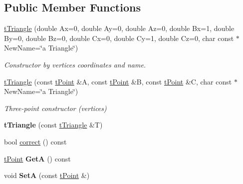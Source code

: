 \subsection*{Public Member Functions}
\begin{DoxyCompactItemize}
\item 
\mbox{\label{classtTriangle_a7d9deae65de86bc7dd8c4659921ab7e4}} 
\hyperlink{classtTriangle_a7d9deae65de86bc7dd8c4659921ab7e4}{t\+Triangle} (double Ax=0, double Ay=0, double Az=0, double Bx=1, double By=0, double Bz=0, double Cx=0, double Cy=1, double Cz=0, char const $\ast$New\+Name=\char`\"{}a Triangle\char`\"{})
\begin{DoxyCompactList}\small\item\em Constructor by vertices coordinates and name. \end{DoxyCompactList}\item 
\mbox{\label{classtTriangle_a083202f8a4ee5ad43997f7dfd02aa903}} 
\hyperlink{classtTriangle_a083202f8a4ee5ad43997f7dfd02aa903}{t\+Triangle} (const \hyperlink{classtPoint}{t\+Point} \&A, const \hyperlink{classtPoint}{t\+Point} \&B, const \hyperlink{classtPoint}{t\+Point} \&C, char const $\ast$New\+Name=\char`\"{}a Triangle\char`\"{})
\begin{DoxyCompactList}\small\item\em Three-\/point constructor (vertices) \end{DoxyCompactList}\item 
\mbox{\label{classtTriangle_a64a9bc79b605a895405862df622b2508}} 
{\bfseries t\+Triangle} (const \hyperlink{classtTriangle}{t\+Triangle} \&T)
\item 
bool \hyperlink{classtTriangle_a21ecf9d970912497eca5009d6965aa54}{correct} () const
\item 
\mbox{\label{classtTriangle_a75c20d7c45085d9d3b510c4a457c1daa}} 
\hyperlink{classtPoint}{t\+Point} {\bfseries GetA} () const
\item 
\mbox{\label{classtTriangle_a2a6bbddf53b623165d2fba195287612b}} 
void {\bfseries SetA} (const \hyperlink{classtPoint}{t\+Point} \&)
\item 
\mbox{\label{classtTriangle_a243e7cc75b1a80d7a4901927d87c3161}} 

\end{DoxyCompactItemize}
